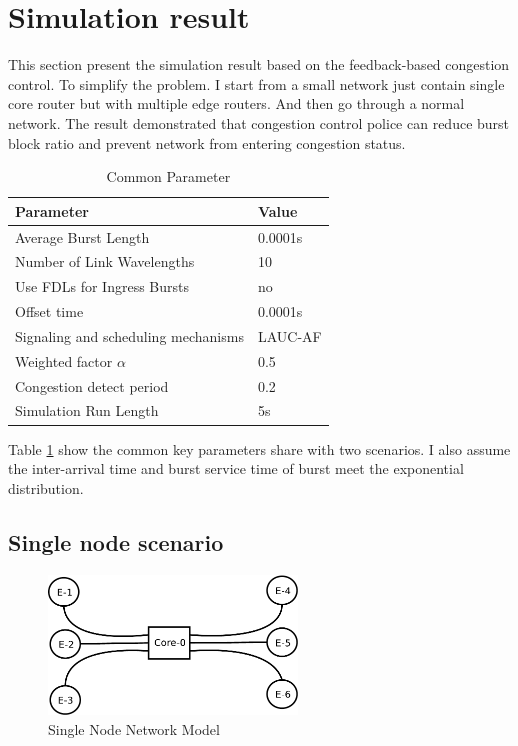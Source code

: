 \section{Simulation result}

This section present the simulation result based on the feedback-based congestion control. To simplify the problem. I start from a small network just contain single core router but with multiple edge routers. And then go through a normal network. The result demonstrated that congestion control police can reduce burst block ratio and prevent network from entering congestion status.

\begin{table}[!htb]
\renewcommand{\arraystretch}{1.3}
\caption{Common Parameter}
\label{tab:cp}
\centering
\begin{tabular}{l l}
\toprule
Parameter & Value \\
\midrule
Average Burst Length & 0.0001s \\
Number of Link Wavelengths & 10 \\
Use FDLs for Ingress Bursts     & no \\
Offset time & 0.0001s\\
Signaling and scheduling mechanisms & LAUC-AF \\
Weighted factor $\alpha$  & 0.5\\
Congestion detect period & 0.2 \\
Simulation Run Length & 5s \\
\bottomrule
\end{tabular}
\end{table}

Table \ref{tab:cp} show the common key parameters share with two scenarios. I also assume the inter-arrival time and burst service time of burst meet the exponential distribution. 

\subsection{Single node scenario}

\begin{figure}[!htb]
\centering
\includegraphics[width=2.6in]{fig/single_node_topo}
\caption{Single Node Network Model}
\label{fig:sn_topo}
\end{figure}

